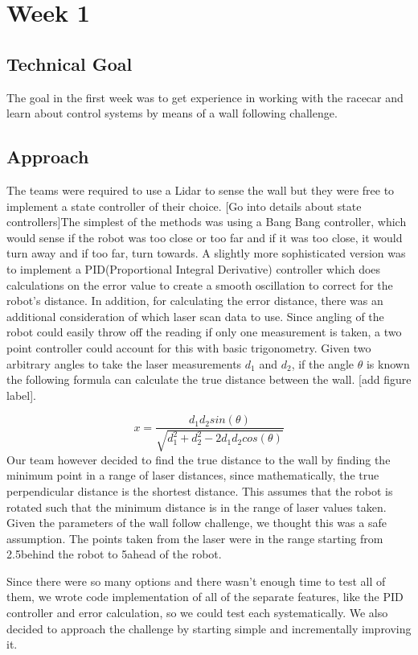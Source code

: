 \documentclass[journal, a4paper]{IEEEtran}
\begin{document}
\section{Week 1}
\subsection{Technical Goal}
The goal in the first week was to get experience in working with the racecar and learn about control systems by means of a wall following challenge. 
\subsection{Approach}
The teams were required to use a Lidar to sense the wall but they were free to implement a state controller of their choice. [Go into details about state controllers]The simplest of the methods was using a Bang Bang controller, which would sense if the robot was too close or too far and if it was too close, it would turn away and if too far, turn towards. A slightly more sophisticated version was to implement a PID(Proportional Integral Derivative) controller which does calculations on the error value to create a smooth oscillation to correct for the robot’s distance. In addition, for calculating the error distance, there was an additional consideration of which laser scan data to use. Since angling of the robot could easily throw off the reading if only one measurement is taken, a two point controller could account for this with basic trigonometry. Given two arbitrary angles to take the laser measurements $d_1$ and $d_2$, if the angle $\theta$ is known the following formula can calculate the true distance between the wall. [add figure label]. 
\begin{equation}
x = \frac{d_1d_2sin(\theta)}{\sqrt{d_1^2+d_2^2-2d_1d_2cos(\theta)}}
\end{equation}
Our team however decided to find the true distance to the wall by finding the minimum point in a range of laser distances, since mathematically, the true perpendicular distance is the shortest distance. This assumes that the robot is rotated such that the minimum distance is in the range of laser values taken. Given the parameters of the wall follow challenge, we thought this was a safe assumption. The points taken from the laser were in the range starting from 2.5\degree behind the robot to 5\degree ahead of the robot.
\par Since there were so many options and there wasn’t enough time to test all of them, we wrote code implementation of all of the separate features, like the PID controller and error calculation, so we could test each systematically. We also decided to approach the challenge by starting simple and incrementally improving it.
\end{document}
